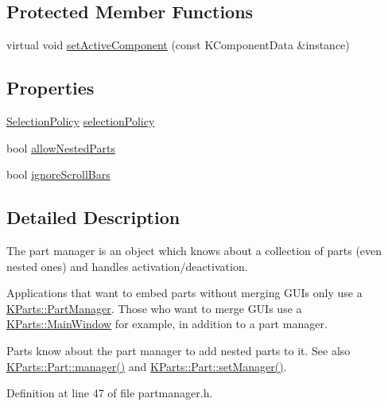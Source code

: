 \subsection*{Protected Member Functions}
\begin{DoxyCompactItemize}
\item 
virtual void \hyperlink{classKParts_1_1PartManager_a17cac95827d9bccd23b766582ad349ab}{set\+Active\+Component} (const K\+Component\+Data \&instance)
\end{DoxyCompactItemize}
\subsection*{Properties}
\begin{DoxyCompactItemize}
\item 
\hyperlink{classKParts_1_1PartManager_a7db25fb7e7f91548fa15566b3af4bb34}{Selection\+Policy} \hyperlink{classKParts_1_1PartManager_a277840d67f7fbbacf3e11a272d649ac1}{selection\+Policy}
\item 
bool \hyperlink{classKParts_1_1PartManager_a779543221cd7fa24276da76cf17226f4}{allow\+Nested\+Parts}
\item 
bool \hyperlink{classKParts_1_1PartManager_a070b8ead9df929e2de58fc4a02b9e8ba}{ignore\+Scroll\+Bars}
\end{DoxyCompactItemize}


\subsection{Detailed Description}
The part manager is an object which knows about a collection of parts (even nested ones) and handles activation/deactivation.

Applications that want to embed parts without merging G\+U\+Is only use a \hyperlink{classKParts_1_1PartManager}{K\+Parts\+::\+Part\+Manager}. Those who want to merge G\+U\+Is use a \hyperlink{classKParts_1_1MainWindow}{K\+Parts\+::\+Main\+Window} for example, in addition to a part manager.

Parts know about the part manager to add nested parts to it. See also \hyperlink{classKParts_1_1Part_a06ea4dd249752f23229bc30b693eed44}{K\+Parts\+::\+Part\+::manager()} and \hyperlink{classKParts_1_1Part_afb87e3aed12cfdd6ecf057f916c7889f}{K\+Parts\+::\+Part\+::set\+Manager()}. 

Definition at line 47 of file partmanager.\+h.



